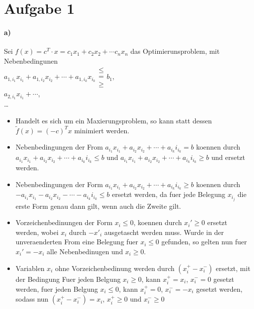 




\newcommand{\nr}{9}


\section*{Aufgabe 1}
\paragraph{a)}
Sei $f(x) = c^T \cdot x = c_1 x_1 + c_2 x_2 + \cdots c_n x_n$ das Optimierunsproblem, mit Nebenbedingunen\\
    $a_{1,i_1}  x_{i_1} + a_{1,i_2} x_{i_2} + \cdots + a_{1,i_k} x_{i_k} \begin{matrix}\leq\\=\\\geq\end{matrix}b_1$, \\
    $a_{2,i_1} x_{i_1} + \cdots$, \\\ldots

\begin{itemize}
\item Handelt es sich um ein Maxierungsproblem, so kann statt dessen $\tilde{f}(x) = (-c)^T x$ minimiert werden.
\item Nebenbedingungen der From $a_{i_1} x_{i_1} + a_{i_2} x_{i_2} + \cdots + a_{i_k} i_{i_k} = b$ koennen
    durch $a_{i_1} x_{i_1} + a_{i_2} x_{i_2} + \cdots + a_{i_k} i_{i_k} \leq b$ und 
    $a_{i_1} x_{i_1} + a_{i_2} x_{i_2} + \cdots + a_{i_k} i_{i_k} \geq b$ und 
    ersetzt werden.
\item Nebenbedingungen der Form $a_{i_1} x_{i_1} + a_{i_2} x_{i_2} + \cdots + a_{i_k} i_{i_k} \geq b$ koennen
    durch $-a_{i_1} x_{i_1} - a_{i_2} x_{i_2} - \cdots - a_{i_k} i_{i_k} \leq b$ ersetzt werden,
    da fuer jede Belegung $x_{i_j}$ die erste Form genau dann gilt, wenn auch die Zweite gilt.
\item Vorzeichenbedinungen der Form $x_i \leq 0$, koennen durch $x_i' \geq 0$ ersetzt werden, 
    wobei $x_i$ durch $-x'_i$ ausgetascht werden muss.
    Wurde in der unveraenderten From eine Belegung fuer $x_i \leq 0$ gefunden, so gelten nun fuer $x_i' = -x_i$ 
    alle Nebenbedinugen und $x_i \geq 0$.
\item Variablen $x_i$ ohne Vorzeichenbedinung werden durch $(x_i^+ - x_i^-)$ ersetzt, mit der Bedingung 
    Fuer jeden Belgung $x_i \geq 0$, kann $x_i^+=x_i$, $x_i^-=0$ gesetzt werden, 
    fuer jeden Belgung $x_i \leq 0$, kann $x_i^+=0$, $x_i^-=-x_i$ gesetzt werden, sodass nun $(x_i^+ - x_i^-) = x_i$, 
    $x_i^+ \geq 0$ und  $x_i^- \geq 0$
\end{itemize}

